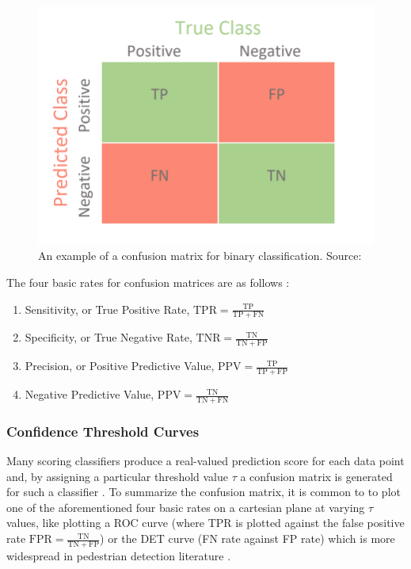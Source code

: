     \begin{figure}
        \centering
        \includegraphics[width=0.5\linewidth]{images/conf_matrix.png}
        \caption{An example of a confusion matrix for binary classification. Source: \cite{conf_matrix}}
        \label{fig:conf_matrix}
    \end{figure}

    The four basic rates for confusion matrices are as follows \cite{chicco_eval_2023}:
    \begin{enumerate}
        \item Sensitivity, or True Positive Rate, $\mathrm{TPR}=\frac{\mathrm{TP}}{\mathrm{TP}+\mathrm{FN}}$

        \item Specificity, or True Negative Rate, $\mathrm{TNR}=\frac{\mathrm{TN}}{\mathrm{TN}+\mathrm{FP}}$
        
        \item Precision, or Positive Predictive Value, $\mathrm{PPV}=\frac{\mathrm{TP}}{\mathrm{TP}+\mathrm{FP}}$
        
        \item Negative Predictive Value, $\mathrm{PPV}=\frac{\mathrm{TN}}{\mathrm{TN}+\mathrm{FN}}$
    \end{enumerate} 

    \subsubsection{Confidence Threshold Curves}

    Many scoring classifiers produce a real-valued prediction score for each data point and, by assigning a particular threshold value $\tau$ a confusion matrix is generated for such a classifier \cite{chicco_jurman_2020_mcc_f1}. To summarize the confusion matrix, it is common to to plot one of the aforementioned four basic rates on a cartesian plane at varying $\tau$ values, like plotting a ROC curve (where TPR is plotted against the false positive rate $\mathrm{FPR}=\frac{\mathrm{TN}}{\mathrm{TN}+\mathrm{FP}}$) or the DET curve (FN rate against FP rate) which is more widespread in pedestrian detection literature \cite{dalal_2005_histograms} \cite{dollar_2012_pedestrian}. 

